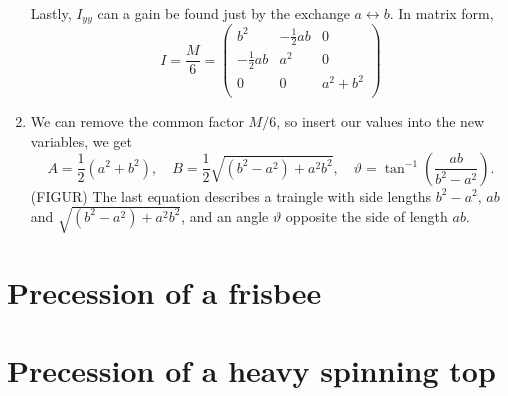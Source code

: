 \documentclass{article}
\begin{document}
\begin{enumerate}[label=(\alph*)]
\begin{align*}
        \end{align*} 
        Lastly, $I_{yy}$ can a gain be found just by the exchange $a \leftrightarrow b$. In matrix form,
        \begin{equation*}
            I = \frac{M}{6} = 
            \begin{pmatrix*}
                b^2 & -\frac{1}{2} ab & 0 \\
                -\frac{1}{2} ab & a^2 & 0 \\
                0 & 0 & a^2 + b^2 \\
            \end{pmatrix*}
        \end{equation*}
        \item We can remove the common factor $M/6$, so insert our values into the new variables, we get
        \begin{equation*}
            A = \frac{1}{2}(a^2 + b^2), \quad B = \frac{1}{2}\sqrt{(b^2 - a^2) +a^2b^2}, \quad \vartheta = \tan^{-1}\left( \frac{ab}{b^2 - a^2} \right).
        \end{equation*}
        (FIGUR) The last equation describes a traingle with side lengths $b^2 - a^2, \, ab$ and $\sqrt{(b^2 - a^2) +a^2b^2}$, and an angle $\vartheta$ opposite the side of length $ab.$ 

    \end{enumerate}
    \section{Precession of a frisbee}
    \section{Precession of a heavy spinning top}
\end{document}
